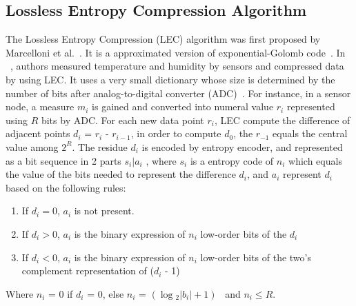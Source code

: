 \subsection{Lossless Entropy Compression Algorithm}

The Lossless Entropy Compression (LEC) algorithm was first proposed by Marcelloni et
al.~\cite{marcelloni2008simple}. It is a approximated version of
exponential-Golomb code~\cite{teuhola1978compression}. In
~\cite{marcelloni2008simple}, authors measured temperature and humidity by
sensors and compressed data by using LEC. It uses a very small dictionary whose
size is determined by the number of bits after analog-to-digital converter (ADC)~\cite{marcelloni2008simple,marcelloni2009efficient}. For instance, in
a sensor node, a measure $m_i$ is gained and converted into numeral value $r_i$
represented using $R$ bits by ADC. For each new data point $r_i$, LEC compute the
difference of adjacent points $d_i$ = $r_i$ - $r_{i-1}$, in order to compute
$d_0$, the $r_{-1}$ equals the central value among $2^R$. The residue $d_i$
is encoded by entropy encoder, and represented as a bit sequence in 2 parts $s_i |
a_i$ , where $s_i$ is a entropy code of $n_i$ which equals the value of the bits needed to represent the difference
$d_i$, and $a_i$ represent $d_i$ based on the following rules:
\begin{enumerate}
    \item If $d_i = 0$, $a_i$ is not present.    
    \item If $d_i > 0$, $a_i$ is the binary expression of $n_i$ low-order bits
    of the $d_i$
    \item If $d_i < 0$, $a_i$ is the binary expression of $n_i$ low-order bits
    of the two's complement representation of ($d_i$ - 1)
\end{enumerate}
\noindent Where $n_i$ = 0 if $d_i$ = 0, else $n_i$ = $(\log{_2}{\left|{b_i}\right|} +
1)$~\cite{li2016temporal} and $n_i \leq R$.

